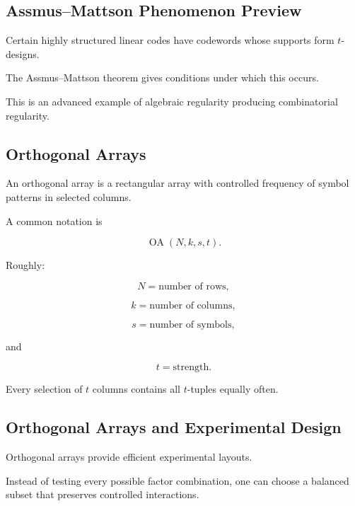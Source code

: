 \subsection{Assmus--Mattson Phenomenon Preview}
\label{subsec:assmus-mattson-preview}

Certain highly structured linear codes have codewords whose supports
form \(t\)-designs.

The Assmus--Mattson theorem gives conditions under which this occurs.

This is an advanced example of algebraic regularity producing
combinatorial regularity.

\subsection{Orthogonal Arrays}
\label{subsec:orthogonal-arrays}

An orthogonal array is a rectangular array with controlled frequency of
symbol patterns in selected columns.

A common notation is

\[
\boxed{
\operatorname{OA}(N,k,s,t).
}
\]

Roughly:

\[
N
=
\text{number of rows},
\]

\[
k
=
\text{number of columns},
\]

\[
s
=
\text{number of symbols},
\]

and

\[
t
=
\text{strength}.
\]

Every selection of \(t\) columns contains all \(t\)-tuples equally
often.

\subsection{Orthogonal Arrays and Experimental Design}
\label{subsec:orthogonal-arrays-experiments}

Orthogonal arrays provide efficient experimental layouts.

Instead of testing every possible factor combination, one can choose a
balanced subset that preserves controlled interactions.

